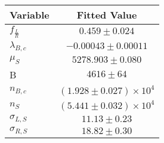 \begin{tabular}[t]{lc}
\hline
Variable &Fitted Value\\
\hline\hline
$f_{\frac{L}{R}}$&$0.459\pm0.024$\\
\hline
$\lambda_{B,c}$&$-0.00043\pm0.00011$\\
\hline
$\mu_S$&$5278.903\pm0.080$\\
\hline
B&$4616\pm64$\\
\hline
$n_{B,c}$&$(1.928\pm0.027)\times 10^4$\\
\hline
$n_S$&$(5.441\pm0.032)\times 10^4$\\
\hline
$\sigma_{L, S}$&$11.13\pm0.23$\\
\hline
$\sigma_{R, S}$&$18.82\pm0.30$\\
\hline
\end{tabular}